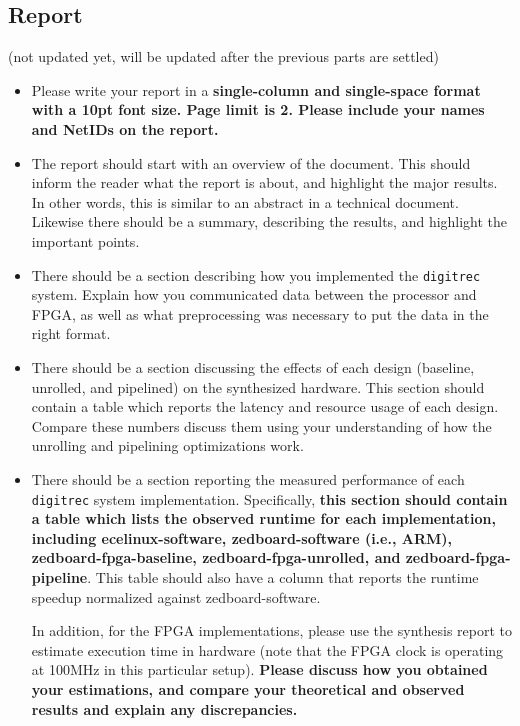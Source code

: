 \documentclass[paper=letter, fontsize=11.6pt]{scrartcl} %
\numberwithin{equation}{section} %
\numberwithin{figure}{section} %
\numberwithin{table}{section} %
\begin{document}
\subsection{Report}
(not updated yet, will be updated after the previous parts are settled)
\begin{itemize}
\item Please write your report in a \textbf{single-column and single-space format with a 10pt font size. Page limit is 2. Please include your names and NetIDs on the report.}

\item The report should start with an overview of the document. This should inform the reader what the report is about, and highlight the major results. In other words, this is similar to an abstract in a technical document. Likewise there should be a summary, describing the results, and highlight the important points.

\item There should be a section describing how you implemented the \texttt{digitrec} system. Explain how you communicated data between the processor and FPGA, as well as what preprocessing was necessary to put the data in the right format.

\item There should be a section discussing the effects of each design (baseline, unrolled, and pipelined) on the synthesized hardware. This section should contain a table which reports the latency and resource usage of each design. Compare these numbers discuss them using your understanding of how the unrolling and pipelining optimizations work.
  
\item There should be a section reporting the measured performance of each \texttt{digitrec} system implementation. Specifically, \textbf{this section should contain a table which lists the observed runtime for each implementation, including ecelinux-software, zedboard-software (i.e., ARM), zedboard-fpga-baseline, zedboard-fpga-unrolled, and zedboard-fpga-pipeline}. This table should also have a column that reports the runtime speedup normalized against zedboard-software. 

In addition, for the FPGA implementations, please use the synthesis report to estimate execution time in hardware (note that the FPGA clock is operating at 100MHz in this particular setup). \textbf{Please discuss how you obtained your estimations, and compare your theoretical and observed results and explain any discrepancies.} 


\end{itemize}
\end{document}
